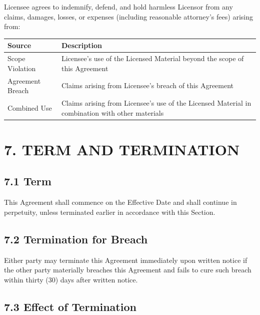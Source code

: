 \documentclass[
  11pt,
]{article}
\begin{document}
Licensee agrees to indemnify, defend, and hold harmless Licensor from
any claims, damages, losses, or expenses (including reasonable
attorney's fees) arising from:

\begin{table}[h]
\centering
\begin{tabular}{L{3.5cm}L{10.5cm}}
\toprule
\textbf{Source} & \textbf{Description} \\
\midrule
Scope Violation & Licensee's use of the Licensed Material beyond the scope of this Agreement \\
Agreement Breach & Claims arising from Licensee's breach of this Agreement \\
Combined Use & Claims arising from Licensee's use of the Licensed Material in combination with other materials \\
\bottomrule
\end{tabular}
\end{table}

\hypertarget{term-and-termination}{%
\section{7. TERM AND TERMINATION}\label{term-and-termination}}

\hypertarget{term}{%
\subsection{7.1 Term}\label{term}}

This Agreement shall commence on the Effective Date and shall continue
in perpetuity, unless terminated earlier in accordance with this
Section.

\hypertarget{termination-for-breach}{%
\subsection{7.2 Termination for Breach}\label{termination-for-breach}}

Either party may terminate this Agreement immediately upon written
notice if the other party materially breaches this Agreement and fails
to cure such breach within thirty (30) days after written notice.

\hypertarget{effect-of-termination}{%
\subsection{7.3 Effect of Termination}\label{effect-of-termination}}
\end{document}

